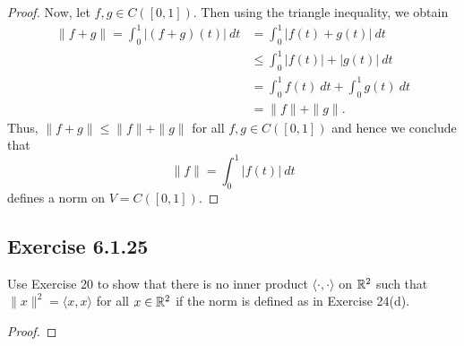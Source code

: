 \begin{enumerate}
\begin{proof}
        Now, let \( f,g \in C([0,1]) \). Then using the triangle inequality, we obtain
        \begin{align*}
            \| f + g \| = \int_{ 0 }^{ 1 } | (f+g)(t) |  \ dt &= \int_{ 0 }^{ 1 }  | f(t) + g(t) |  \ dt \\
                                                              &\leq \int_{ 0 }^{ 1 } | f(t) |  + | g(t) |  \ dt \\
                                                              &= \int_{ 0 }^{ 1 } f(t)  \ dt + \int_{ 0 }^{ 1 }  g(t) \ dt \\
                                                              &= \|f\| + \|g\|.
        \end{align*}
        Thus, \( \|f+g\| \leq \|f\| + \|g\| \) for all \( f,g \in C([0,1]) \) and hence we conclude that
        \[ \|f\| = \int_{ 0 }^{ 1 } | f(t) |  \ dt  \]
        defines a norm on \( V = C([0,1])  \).
        \end{proof}
\end{enumerate}

\subsection*{Exercise 6.1.25} Use Exercise 20 to show that there is no inner product \( \langle \cdot , \cdot \rangle \) on \( \mathbb{R}^{2} \) such that \( \|x\|^{2} = \langle x , x \rangle \) for all \( x \in \mathbb{R}^{2} \) if the norm is defined as in Exercise 24(d).
\begin{proof}

\end{proof}

